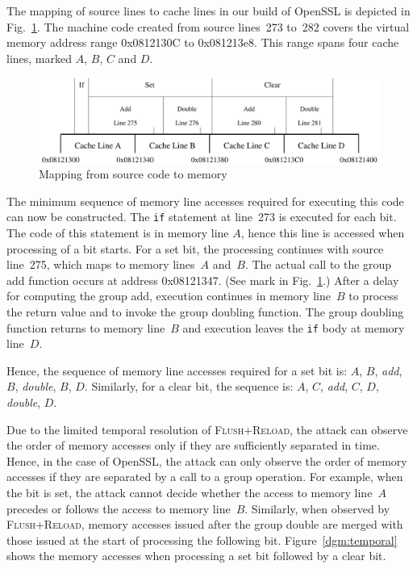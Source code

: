 \documentclass[twocolumn]{svjour3}
\begin{document}
The mapping of source lines to cache lines in our build of OpenSSL is depicted in Fig.~\ref{dgm:memory}.
The machine code created from source lines~273 to~282 covers the virtual memory address range 0x0812130C
to 0x081213e8.
This range spans four cache lines, marked $A$, $B$, $C$ and $D$.


\begin{figure}[htb]
\centering\includegraphics[width=\columnwidth]{images/memory}
\caption{Mapping from source code to memory\label{dgm:memory}}
\end{figure}


The minimum sequence of memory line accesses required for executing this code can now be constructed.
The \texttt{if} statement at line~273 is executed for each bit.  
The code of this statement is in memory line $A$, hence this line is accessed when processing of a bit starts.
For a set bit, the processing continues with source line~275, which maps to memory lines~$A$ and~$B$.
The actual call to the group add function occurs at address 0x08121347.
(See mark in Fig.~\ref{dgm:memory}.)
After a delay for computing the group add, execution continues in memory line~$B$ to process the return value and 
to invoke the group doubling function.
The group doubling function returns to memory line~$B$ and execution leaves the \texttt{if} body at memory line~$D$.

Hence, the sequence of memory line accesses required for a set bit is: $A$, $B$, \textit{add}, $B$, \textit{double}, $B$, $D$.
Similarly, for a clear bit, the sequence is: $A$, $C$, \textit{add}, $C$, $D$, \textit{double}, $D$.

Due to the limited temporal resolution of \textsc{Flush+Reload}, the attack can observe the order of memory accesses only
if they are sufficiently separated in time.
Hence, in the case of OpenSSL, the attack can only observe the order of memory accesses if they are separated by a call
to a group operation.
For example, when the bit is set, the attack cannot decide whether the access to memory line~$A$ precedes or follows the access
to memory line~$B$.
Similarly, when observed by \textsc{Flush+Reload}, memory accesses issued after the group double are merged with those 
issued at the start of processing the following bit.
Figure~\ref{dgm:temporal} shows the memory accesses when processing a set bit followed by
a clear bit.
\end{document}
